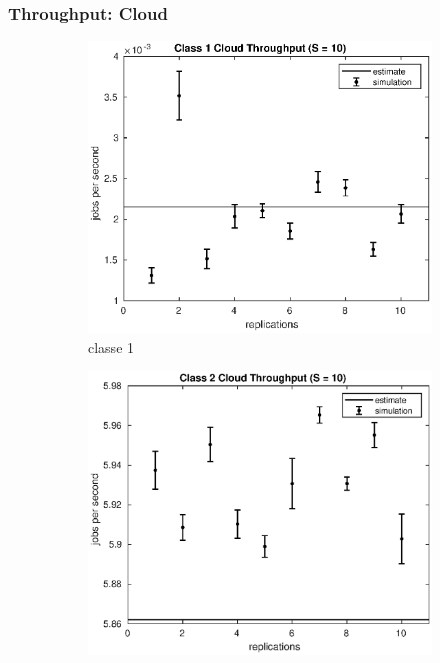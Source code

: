 \subsubsection{Throughput: Cloud}
%
\begin{figure}[!h]
\centering
%
\begin{subfigure}[t]{0.49\textwidth}
\includegraphics[width=\textwidth]{figures/simul/10_500K_x1cloud}
\caption{classe 1}
\label{10_x1cloud}
\end{subfigure}
%
\begin{subfigure}[t]{0.49\textwidth}
\includegraphics[width=\textwidth]{figures/simul/10_500K_x2cloud}

\end{subfigure}
\end{figure}
